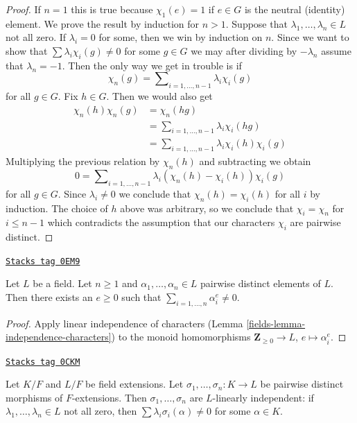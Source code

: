 \begin{proof}
If $n = 1$ this is true because $\chi_1(e) = 1$ if $e \in G$ is the
neutral (identity) element. We prove the result by induction for $n > 1$.
Suppose that $\lambda_1, \ldots, \lambda_n \in L$ not all zero.
If $\lambda_i = 0$ for some, then we win by induction on $n$.
Since we want to show that $\sum \lambda_i\chi_i(g) \not = 0$
for some $g \in G$ we may after dividing by $-\lambda_n$
assume that $\lambda_n = -1$. Then the only way we get in trouble
is if
$$
\chi_n(g) = \sum\nolimits_{i = 1, \ldots, n - 1} \lambda_i\chi_i(g)
$$
for all $g \in G$. Fix $h \in G$. Then we would also get
\begin{align*}
\chi_n(h)\chi_n(g) & = \chi_n(hg) \\
& = \sum\nolimits_{i = 1, \ldots, n - 1} \lambda_i\chi_i(hg) \\
& = \sum\nolimits_{i = 1, \ldots, n - 1} \lambda_i\chi_i(h) \chi_i(g)
\end{align*}
Multiplying the previous relation by $\chi_n(h)$ and subtracting we obtain
$$
0 = \sum\nolimits_{i = 1, \ldots, n - 1}
\lambda_i (\chi_n(h) - \chi_i(h)) \chi_i(g)
$$
for all $g \in G$. Since $\lambda_i \not = 0$ we conclude that
$\chi_n(h) = \chi_i(h)$ for all $i$ by induction.
The choice of $h$ above was arbitrary, so we conclude
that $\chi_i = \chi_n$ for $i \leq n - 1$ which contradicts
the assumption that our characters $\chi_i$ are pairwise distinct.
\end{proof}

\begin{lemma}
\label{fields-lemma-sums-of-powers}
\href{https://stacks.math.columbia.edu/tag/0EM9}{\texttt{Stacks tag 0EM9}}

Let $L$ be a field. Let $n \geq 1$ and $\alpha_1, \ldots, \alpha_n \in L$
pairwise distinct elements of $L$. Then there exists an
$e \geq 0$ such that $\sum_{i = 1, \ldots, n} \alpha_i^e \not = 0$.
\end{lemma}

\begin{proof}

Apply linear independence of characters
(Lemma \ref{fields-lemma-independence-characters})
to the monoid homomorphisms $\mathbf{Z}_{\geq 0} \to L$,
$e \mapsto \alpha_i^e$.
\end{proof}

\begin{lemma}
\label{fields-lemma-independence-embeddings}
\href{https://stacks.math.columbia.edu/tag/0CKM}{\texttt{Stacks tag 0CKM}}

Let $K/F$ and $L/F$ be field extensions. Let
$\sigma_1, \ldots, \sigma_n : K \to L$ be pairwise distinct
morphisms of $F$-extensions. Then $\sigma_1, \ldots, \sigma_n$
are $L$-linearly independent: if $\lambda_1, \ldots, \lambda_n \in L$
not all zero, then $\sum \lambda_i\sigma_i(\alpha) \not = 0$
for some $\alpha \in K$.
\end{lemma}

